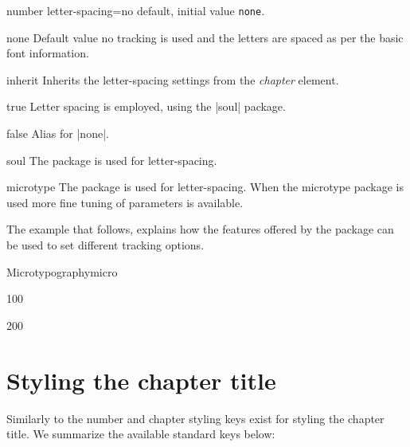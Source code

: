 \begin{docKey}[phd]{number letter-spacing}{=}{no default, initial value \texttt{none}}.
\end{docKey}

\begin{marglist}
\item[none] Default value no tracking is used and the letters are spaced as per the basic font information.
\item[inherit] Inherits the letter-spacing settings from the \emph{chapter} element.
\item[true] Letter spacing is employed, using the |soul| package.
\item[false] Alias for |none|.
\item[soul] The  package is used for letter-spacing.
\item[microtype] The  package is used for letter-spacing. When the microtype package is used more fine tuning of parameters is available.
\end{marglist}

The example that follows, explains how the features offered by the  package can be used to
set different tracking options.

\begin{texexample}{Microtypography}{micro}
\bgroup

 { 100 }

{\huge {}}

 { 200 }
 
{\huge {}}

\egroup
\end{texexample}


\hbox{}

\hbox{}


\section{Styling the chapter title}

Similarly to the number and chapter styling keys exist for styling the chapter title. We summarize the available standard keys below:

